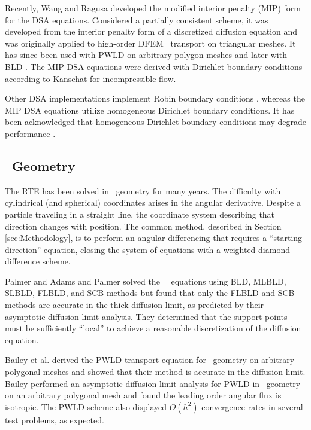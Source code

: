 \documentclass{article}
\begin{document}
Recently, Wang and Ragusa \cite{WangRagusaDSA} developed the modified interior penalty (MIP) form for the DSA equations. Considered a partially consistent scheme, it was developed from the interior penalty form of a discretized diffusion equation and was originally applied to high-order DFEM \SN\ transport on triangular meshes. It has since been used with PWLD on arbitrary polygon meshes \cite{TurcksinDiscontinuousDSA} and later with BLD \cite{TurcksinDSABLD}. The MIP DSA equations were derived with Dirichlet boundary conditions according to Kanschat \cite{KanschatDGViscousIncompressFlow} for incompressible flow.

Other DSA implementations implement Robin boundary conditions \cite{AdamsDSADFEM, WarsaFullyConsistentLDDSA}, whereas the MIP DSA equations utilize homogeneous Dirichlet boundary conditions. It has been acknowledged that homogeneous Dirichlet boundary conditions may degrade performance \cite{WangDissertation}.

\subsection{\RZ\ Geometry}

The RTE has been solved in \RZ\ geometry for many years. The difficulty with cylindrical (and spherical) coordinates arises in the angular derivative. Despite a particle traveling in a straight line, the coordinate system describing that direction changes with position. The common method, described in Section \ref{sec:Methodology}, is to perform an angular differencing that requires a ``starting direction'' equation, closing the system of equations with a weighted diamond difference scheme.

Palmer and Adams \cite{PalmerCurvilinearTransport} and Palmer \cite{PalmerDissertation} solved the \RZ\ \SN\ equations using BLD, MLBLD, SLBLD, FLBLD, and SCB methods but found that only the FLBLD and SCB methods are accurate in the thick diffusion limit, as predicted by their asymptotic diffusion limit analysis. They determined that the support points must be sufficiently ``local'' to achieve a reasonable discretization of the diffusion equation.

Bailey et al. \cite{BaileyDFEMCylindrical} derived the PWLD transport equation for \RZ\ geometry on arbitrary polygonal meshes and showed that their method is accurate in the diffusion limit. Bailey \cite{BaileyDissertation} performed an asymptotic diffusion limit analysis for PWLD in \RZ\ geometry on an arbitrary polygonal mesh and found the leading order angular flux is isotropic. The PWLD scheme also displayed $O(h^2)$ convergence rates in several test problems, as expected.
\end{document}
